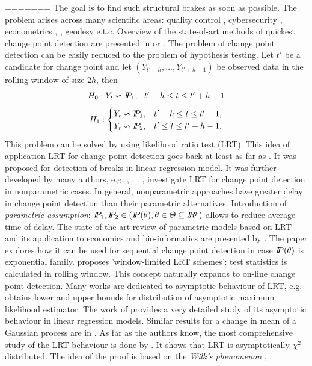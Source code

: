 =======
The goal is to find such structural brakes as soon as possible. The problem arises across many scientific areas: quality control \citet{lai1995sequential}, cybersecurity   \citet{Cyber2}, econometrics \citet{SpokoinyCP}, \citet{Econom2}, geodesy e.t.c. Overview of the state-of-art methods of quickest change point detection are presented in \citet{ReviewPolun} or \citet{Shiryaev}.
The problem of change point detection can be easily reduced to the problem of hypothesis testing. Let $t'$ be a candidate for change point and let $(Y_{t' - h},..., Y_{t' + h - 1})$ be observed data in the rolling window of size $2h$, then
\[
H_0: Y_t \backsim \P_1, ~~t' - h \leq t \leq t' + h - 1
\]
\[
H_1: \begin{cases}
Y_t \backsim \P_1, & {t' - h } \leq t \leq {t' - 1}, \\ 
Y_t \backsim \P_2, & {t'} \leq t \leq t' + h - 1. 
\end{cases} 
\]
This problem can be solved by using likelihood ratio test (LRT). This idea of application LRT for change point detection  goes back at least as far as \citet{quandt1960tests}. It was proposed for detection of breaks in linear regression model. It was further developed by many authors, e.g. \citet{kim1989likelihood}, \citet{haccou1987likelihood}, \citet{srivastava1986likelihood}. \citet{liu2008empirical}, \citet{zou2007empirical} investigate LRT for change point detection in nonparametric cases. In general, nonparametric approaches have greater delay in change point detection than their parametric alternatives. Introduction of \textit{parametric assumption}: $\P_1, \P_2 \in (\P(\theta), \theta \in \Theta \subseteq \R^p)$ allows to reduce average time of delay. The state-of-the-art review of parametric models based on LRT and its application to economics and bio-informatics are presented by \citet{ParStatChen}.  The paper \citet{gombay2000sequential} explores how it can be used for sequential change point detection in case $\P(\theta)$ is exponential family. \citet{lai1995sequential} proposes 'window-limited LRT schemes': test statistics is calculated in rolling window. This concept naturally expands to on-line change point detection. Many works are dedicated to asymptotic behaviour of LRT, e.g. \citet{jandhyala1999capturing} obtains lower and upper bounds for distribution of asymptotic maximum likelihood estimator. The work of \citet{kim1994tests} provides a very detailed study of its asymptotic behaviour in linear regression models. Similar results for a change in mean of a Gaussian process are in \citet{fotopoulos2010exact}. As far as the authors know, the most comprehensive study of the LRT behaviour is done by \citet{LRTWilks}. It shows that LRT is asymptotically $\chi^2$ distributed. The idea of the proof is based on the \textit{Wilk's phenomenon} \citet{wilks1938large}, \citet{boucheron2011high}. 
